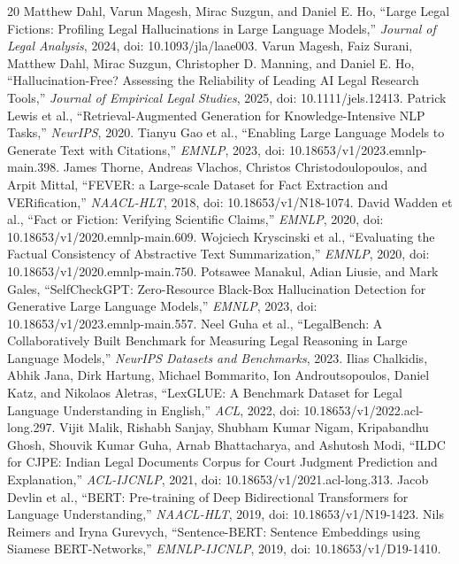 \begin{thebibliography}{20}
 Matthew Dahl, Varun Magesh, Mirac Suzgun, and Daniel E. Ho, ``Large Legal Fictions: Profiling Legal Hallucinations in Large Language Models,'' \emph{Journal of Legal Analysis}, 2024, doi: 10.1093/jla/laae003.
 Varun Magesh, Faiz Surani, Matthew Dahl, Mirac Suzgun, Christopher D. Manning, and Daniel E. Ho, ``Hallucination-Free? Assessing the Reliability of Leading AI Legal Research Tools,'' \emph{Journal of Empirical Legal Studies}, 2025, doi: 10.1111/jels.12413.
 Patrick Lewis et al., ``Retrieval-Augmented Generation for Knowledge-Intensive NLP Tasks,'' \emph{NeurIPS}, 2020.
 Tianyu Gao et al., ``Enabling Large Language Models to Generate Text with Citations,'' \emph{EMNLP}, 2023, doi: 10.18653/v1/2023.emnlp-main.398.
 James Thorne, Andreas Vlachos, Christos Christodoulopoulos, and Arpit Mittal, ``FEVER: a Large-scale Dataset for Fact Extraction and VERification,'' \emph{NAACL-HLT}, 2018, doi: 10.18653/v1/N18-1074.
 David Wadden et al., ``Fact or Fiction: Verifying Scientific Claims,'' \emph{EMNLP}, 2020, doi: 10.18653/v1/2020.emnlp-main.609.
 Wojciech Kryscinski et al., ``Evaluating the Factual Consistency of Abstractive Text Summarization,'' \emph{EMNLP}, 2020, doi: 10.18653/v1/2020.emnlp-main.750.
 Potsawee Manakul, Adian Liusie, and Mark Gales, ``SelfCheckGPT: Zero-Resource Black-Box Hallucination Detection for Generative Large Language Models,'' \emph{EMNLP}, 2023, doi: 10.18653/v1/2023.emnlp-main.557.
 Neel Guha et al., ``LegalBench: A Collaboratively Built Benchmark for Measuring Legal Reasoning in Large Language Models,'' \emph{NeurIPS Datasets and Benchmarks}, 2023.
 Ilias Chalkidis, Abhik Jana, Dirk Hartung, Michael Bommarito, Ion Androutsopoulos, Daniel Katz, and Nikolaos Aletras, ``LexGLUE: A Benchmark Dataset for Legal Language Understanding in English,'' \emph{ACL}, 2022, doi: 10.18653/v1/2022.acl-long.297.
 Vijit Malik, Rishabh Sanjay, Shubham Kumar Nigam, Kripabandhu Ghosh, Shouvik Kumar Guha, Arnab Bhattacharya, and Ashutosh Modi, ``ILDC for CJPE: Indian Legal Documents Corpus for Court Judgment Prediction and Explanation,'' \emph{ACL-IJCNLP}, 2021, doi: 10.18653/v1/2021.acl-long.313.
 Jacob Devlin et al., ``BERT: Pre-training of Deep Bidirectional Transformers for Language Understanding,'' \emph{NAACL-HLT}, 2019, doi: 10.18653/v1/N19-1423.
 Nils Reimers and Iryna Gurevych, ``Sentence-BERT: Sentence Embeddings using Siamese BERT-Networks,'' \emph{EMNLP-IJCNLP}, 2019, doi: 10.18653/v1/D19-1410.

\end{thebibliography}

